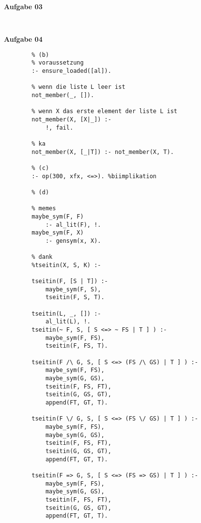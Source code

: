 \documentclass[a4paper,10pt]{article}
\begin{document}
	\textbf{Aufgabe 03}
	\begin{compactenum} [(a)]
		\item
		\item
	\end{compactenum} \

	\textbf{Aufgabe 04}
	\begin{compactenum} [a)]
		\item
		\item \begin{verbatim}
		% (b)
		% voraussetzung
		:- ensure_loaded([al]).

		% wenn die liste L leer ist
		not_member(_, []).

		% wenn X das erste element der liste L ist
		not_member(X, [X|_]) :-
			!, fail.

		% ka
		not_member(X, [_|T]) :- not_member(X, T).

		% (c)
		:- op(300, xfx, <=>). %biimplikation

		% (d)

		% memes
		maybe_sym(F, F)
			:- al_lit(F), !.
		maybe_sym(F, X)
			:- gensym(x, X).

		% dank
		%tseitin(X, S, K) :-

		tseitin(F, [S | T]) :-
			maybe_sym(F, S),
			tseitin(F, S, T).

		tseitin(L, _, []) :-
			al_lit(L), !.
		tseitin(~ F, S, [ S <=> ~ FS | T ] ) :-
			maybe_sym(F, FS),
			tseitin(F, FS, T).

		tseitin(F /\ G, S, [ S <=> (FS /\ GS) | T ] ) :-
			maybe_sym(F, FS),
			maybe_sym(G, GS),
			tseitin(F, FS, FT),
			tseitin(G, GS, GT),
			append(FT, GT, T).

		tseitin(F \/ G, S, [ S <=> (FS \/ GS) | T ] ) :-
			maybe_sym(F, FS),
			maybe_sym(G, GS),
			tseitin(F, FS, FT),
			tseitin(G, GS, GT),
			append(FT, GT, T).

		tseitin(F => G, S, [ S <=> (FS => GS) | T ] ) :-
			maybe_sym(F, FS),
			maybe_sym(G, GS),
			tseitin(F, FS, FT),
			tseitin(G, GS, GT),
			append(FT, GT, T).
		\end{verbatim}
		\item \begin{verbatim}
		\end{verbatim}
		\item \begin{verbatim}
		\end{verbatim}
		\end{compactenum}
\end{document}
